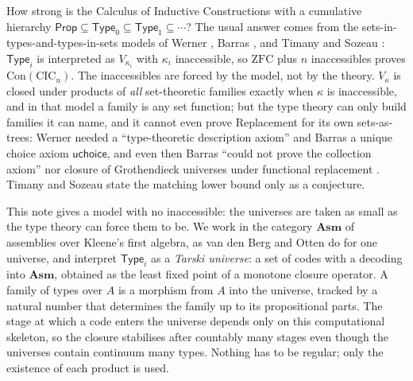 \documentclass[10pt]{article}
\newcommand{\Asm}{\mathbf{Asm}}
\newcommand{\Prop}{\mathsf{Prop}}
\newcommand{\Type}{\mathsf{Type}}
\newcommand{\CIC}{\mathrm{CIC}}
\newcommand{\ZFC}{\mathrm{ZFC}}
\newcommand{\Con}{\mathrm{Con}}
\newcommand{\uchoice}{\mathsf{uchoice}}
\begin{document}
How strong is the Calculus of Inductive Constructions with a cumulative
hierarchy $\Prop\subseteq\Type_0\subseteq\Type_1\subseteq\cdots$? The usual
answer comes from the sets-in-types-and-types-in-sets models of Werner
\cite{werner97}, Barras \cite{barras10}, and Timany and Sozeau
\cite{timanysozeau17}: $\Type_i$ is interpreted as $V_{\kappa_i}$ with
$\kappa_i$ inaccessible, so $\ZFC$ plus $n$ inaccessibles proves
$\Con(\CIC_n)$. The inaccessibles are forced by the model, not by the theory.
$V_\kappa$ is closed under products of \emph{all} set-theoretic families
exactly when $\kappa$ is inaccessible, and in that model a family is any set
function; but the type theory can only build families it can name, and it
cannot even prove Replacement for its own sets-as-trees: Werner needed a
``type-theoretic description axiom'' and Barras a unique choice axiom
$\uchoice$, and even then Barras ``could not prove the collection axiom''
nor closure of Grothendieck universes under functional replacement
\cite{barras10}. Timany and Sozeau state the matching lower bound only as a
conjecture.

This note gives a model with no inaccessible: the universes are taken as
small as the type theory can force them to be. We work in the category
$\Asm$ of assemblies over Kleene's first algebra, as van den Berg and Otten
\cite{vdbergotten23} do for one universe, and interpret $\Type_i$ as a
\emph{Tarski universe}: a set of codes with a decoding into $\Asm$,
obtained as the least fixed point of a monotone closure operator. A family
of types over $A$ is a morphism from $A$ into the universe, tracked by a
natural number that determines the family up to its propositional parts.
The stage at which a code enters the universe depends only on this
computational skeleton, so the closure stabilises after countably many
stages even though the universes contain continuum many types. Nothing has
to be regular; only the existence of each product is used.
\end{document}
